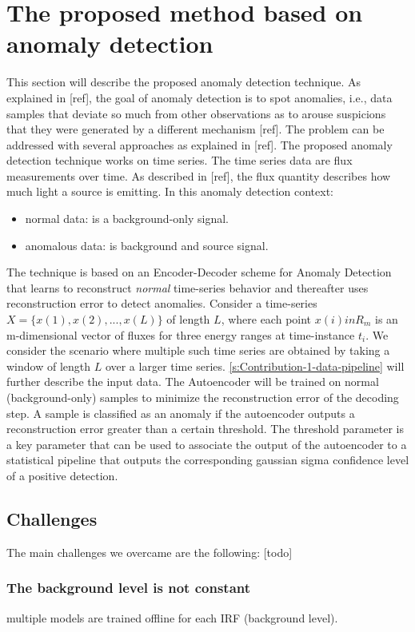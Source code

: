 \section{The proposed method based on anomaly detection}
\label{s:Contribution-1-anomaly-detection}
This section will describe the proposed anomaly detection technique. As explained in [ref], the goal of anomaly detection is to spot anomalies, i.e., data samples that deviate so much from other observations as to arouse suspicions that they were generated by a different mechanism [ref]. The problem can be addressed with several approaches as explained in [ref]. The proposed anomaly detection technique works on time series. The time series data are flux measurements over time. As described in [ref], the flux quantity describes how much light a source is emitting. In this anomaly detection context:
\begin{itemize}
	\item normal data: is a background-only signal. 
	\item anomalous data: is background and source signal.
\end{itemize}
The technique is based on an Encoder-Decoder scheme for Anomaly Detection that learns to reconstruct \textit{normal} time-series behavior and thereafter uses reconstruction error to detect anomalies. Consider a time-series $X = \{x(1), x(2), ..., x (L)\}$ of length $L$, where each point $x(i) in R_m$ is an m-dimensional vector of fluxes for three  energy ranges at time-instance $t_i$. We consider the scenario where multiple such time series are  obtained by taking a window of length $L$ over a larger time series. \autoref{s:Contribution-1-data-pipeline} will further describe the input data. The Autoencoder will be trained on normal (background-only) samples to minimize the reconstruction error of the decoding step. A sample is classified as an anomaly if the autoencoder outputs a reconstruction error greater than a certain threshold. The threshold parameter is a key parameter that can be used to associate the output of the autoencoder to a statistical pipeline that outputs the corresponding gaussian sigma confidence level of a positive detection. 

\subsection{Challenges}
The main challenges we overcame are the following: [todo]
\subsubsection{The background level is not constant}
multiple models are trained offline for each IRF (background level).
